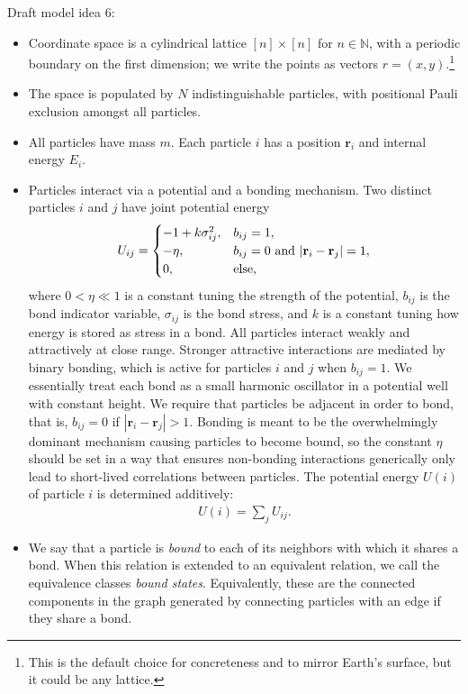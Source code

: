 \documentclass[12pt,letterpaper]{article}
\newcommand{\mb}{\mathbf}
\begin{document}
Draft model idea 6:
\begin{itemize}
\item Coordinate space is a cylindrical lattice $[n] \times [n]$ for $n \in \mathbb{N}$, with a periodic boundary on the first dimension; we write the points as vectors $r = (x, y)$.\footnote{This is the default choice for concreteness and to mirror Earth's surface, but it could be any lattice.}
\item The space is populated by $N$ indistinguishable particles, with positional Pauli exclusion amongst all particles.
\item All particles have mass $m$. Each particle $i$ has a position $\mb{r}_{i}$ and internal energy $E_{i}$.
\item Particles interact via a potential and a bonding mechanism. Two distinct particles $i$ and $j$ have joint potential energy
\begin{align*}
U_{ij} = \begin{cases}
-1 + k\sigma_{ij}^{2}, &b_{ij} = 1, \\
-\eta, &b_{ij} = 0 \textnormal{ and } |\mb{r}_{i} - \mb{r}_{j}| = 1, \\
0, &\textnormal{else},
\end{cases}
\end{align*}
where $0 < \eta \ll 1$ is a constant tuning the strength of the potential, $b_{ij}$ is the bond indicator variable, $\sigma_{ij}$ is the bond stress, and $k$ is a constant tuning how energy is stored as stress in a bond. All particles interact weakly and attractively at close range. Stronger attractive interactions are mediated by binary bonding, which is active for particles $i$ and $j$ when $b_{ij} = 1$. We essentially treat each bond as a small harmonic oscillator in a potential well with constant height. We require that particles be adjacent in order to bond, that is, $b_{ij} = 0$ if $|\mb{r}_{i} - \mb{r}_{j}| > 1$. Bonding is meant to be the overwhelmingly dominant mechanism causing particles to become bound, so the constant $\eta$ should be set in a way that ensures non-bonding interactions generically only lead to short-lived correlations between particles. The potential energy $U(i)$ of particle $i$ is determined additively:
\begin{align*}
U(i) = \sum_{j}U_{ij}.
\end{align*}
\item We say that a particle is {\em bound} to each of its neighbors with which it shares a bond. When this relation is extended to an equivalent relation, we call the equivalence classes {\em bound states}. Equivalently, these are the connected components in the graph generated by connecting particles with an edge if they share a bond.

\end{itemize}
\end{document}
